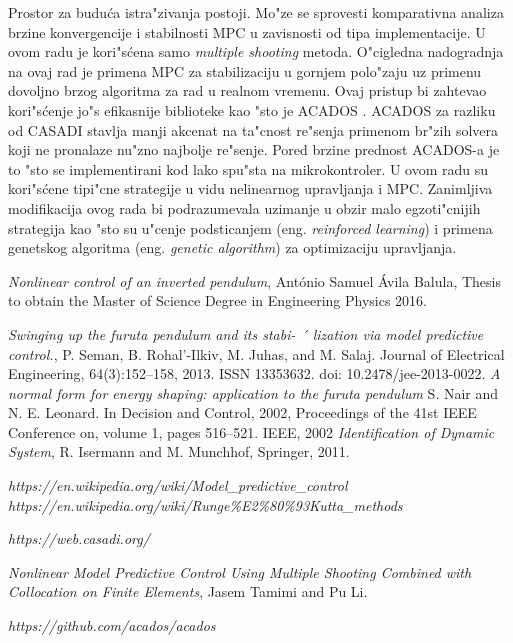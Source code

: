 \documentclass[a4paper,11pt]{article}
\theoremstyle{definition} \newtheorem{deff}{Definicija}[section]
\theoremstyle{definition} \newtheorem{prim}[deff]{Primer}
\theoremstyle{plain} \newtheorem{teor}[deff]{Teorema}
\begin{document}
	Prostor za budu\'ca istra"zivanja postoji. Mo"ze se sprovesti komparativna analiza brzine konvergencije i stabilnosti MPC u zavisnosti od tipa implementacije. U ovom radu je kori"s\'cena samo \emph{multiple shooting} metoda. O"cigledna nadogradnja na ovaj rad je primena MPC za stabilizaciju u gornjem polo"zaju uz primenu dovoljno brzog algoritma za rad u realnom vremenu. Ovaj pristup bi zahtevao kori"s\'cenje jo"s efikasnije biblioteke kao "sto je ACADOS \cite{acados}. ACADOS za razliku od CASADI stavlja manji akcenat na ta"cnost re"senja primenom br"zih solvera koji ne pronalaze nu"zno najbolje re"senje. Pored brzine prednost ACADOS-a je to "sto se implementirani kod lako spu"sta na mikrokontroler. U ovom radu su kori"s\'cene tipi"cne strategije u vidu nelinearnog upravljanja i MPC. Zanimljiva modifikacija ovog rada bi podrazumevala uzimanje u obzir malo egzoti"cnijih strategija kao "sto su u"cenje podsticanjem (eng. \emph{reinforced learning}) i primena genetskog algoritma (eng. \emph{genetic algorithm}) za optimizaciju upravljanja. 
	
	
	
	
	\newpage
	
	\begin{thebibliography}{9}
		\emph{Nonlinear control of an inverted pendulum}, António Samuel Ávila Balula, Thesis to obtain the Master of Science Degree in
		Engineering Physics 2016.
		
		\emph{Swinging up the furuta pendulum and its stabi- ´
			lization via model predictive control.}, P. Seman, B. Rohal’-Ilkiv, M. Juhas, and M. Salaj.  Journal of Electrical Engineering, 64(3):152–158, 2013. ISSN
		13353632. doi: 10.2478/jee-2013-0022.
		\emph{A normal form for energy shaping: application to the furuta pendulum}
		S. Nair and N. E. Leonard. 
		In Decision and Control, 2002, Proceedings of the 41st IEEE Conference on, volume 1, pages
		516–521. IEEE, 2002
		\emph{Identification of Dynamic System}, R. Isermann and M. Munchhof, Springer, 2011.
		
		 \emph{https://en.wikipedia.org/wiki/Model\_predictive\_control}
		\emph{https://en.wikipedia.org/wiki/Runge\%E2\%80\%93Kutta\_methods}
		
		\emph{https://web.casadi.org/}
		
		\emph{Nonlinear Model Predictive Control Using Multiple Shooting Combined with 
			Collocation on Finite Elements}, Jasem Tamimi and Pu Li.
		
		 \emph{https://github.com/acados/acados}
		
	\end{thebibliography}
\end{document}
